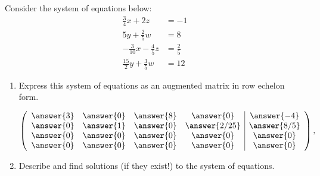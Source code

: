 \documentclass{ximera}
\author{Parisa Fatheddin}
\begin{document}
\begin{exercise} Consider the system of equations below:
\begin{align*}
  \frac{3}{4}x+2z&=-1\\
5y+ \frac{2}{5}w &= 8\\
-\frac{3}{10} x - \frac{4}{5} z &= \frac{2}{5}\\
\frac{15}{2}y + \frac{3}{5}w &= 12
\end{align*}
\begin{enumerate}
\item Express this system of equations as an augmented matrix in row
  echelon form.
  \begin{prompt}
    \[
    \left(\begin{array}{cccc|c}
        \answer{3} &  \answer{0} & \answer{8} & \answer{0} &\answer{-4} \\
        \answer{0} &  \answer{1} & \answer{0} & \answer{2/25} &\answer{8/5}\\
        \answer{0} &  \answer{0} & \answer{0} & \answer{0} &\answer{0}\\
        \answer{0} &  \answer{0} & \answer{0} & \answer{0} &\answer{0}
    \end{array}\right),
    \]
  \end{prompt}
\item Describe and find solutions (if they exist!) to the system of equations.
  \begin{prompt}
\begin{multipleChoice}
\end{multipleChoice}
  \end{prompt}
\end{enumerate}
\end{exercise}
\end{document}
